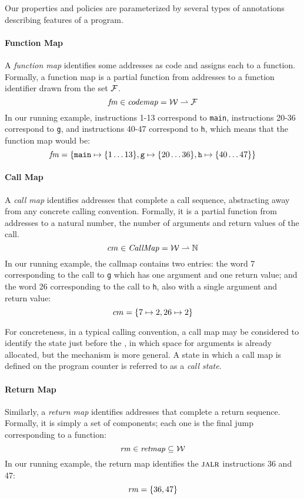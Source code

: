 \documentclass[acmsmall,review,anonymous]{acmart}\settopmatter{printfolios=true,printccs=false,printacmref=false}
\begin{document}
Our properties and policies are parameterized by several types of
annotations describing features of a program.

\paragraph*{Function Map}

A {\em function map} identifies some addresses as code and assigns
each to a function. Formally, a function map is a
partial function from addresses to a function
identifier drawn from the set \(\mathcal{F}\).
\[\mathit{fm} \in \mathit{codemap} = {\mathcal W} \rightharpoonup \mathcal{F}\]
%
In our running example, instructions 1-13 correspond to {\tt main},
instructions 20-36 correspond to {\tt g}, and instructions 40-47
correspond to {\tt h}, which means that the function map would be:
\[ \mathit{fm} = \{\texttt{main} \mapsto \{1\ldots13\}, \texttt{g} \mapsto \{20\ldots36\}, \texttt{h} \mapsto \{40\ldots47\}\}\]

\paragraph*{Call Map}

A {\em call map} identifies addresses that complete a call sequence,
abstracting away from any concrete calling convention. Formally, it is
a partial function from addresses to a natural number, the number of
arguments and return values of the call.
\[cm \in \mathit{CallMap} = {\mathcal W} \rightharpoonup \mathbb{N}\]
%
In our running example, the callmap contains two entries: the word 7
corresponding to the call to {\tt g} which has one argument and one
return value; and the word 26 corresponding to the call to {\tt h},
also with a single argument and return value:
\[ cm = \{ 7 \mapsto 2, 26 \mapsto 2\}\]

For concreteness, in a typical calling convention, a call map may be
considered to identify the state just before the \jal, in which
space for arguments is already allocated, but the mechanism is more
general. A state in which a call map is defined on the program counter
is referred to as a {\it call state}.

\paragraph*{Return Map}
Similarly, a {\em return map} identifies addresses that complete a
return sequence. Formally, it is simply a set of components; each one
is the final jump corresponding to a function:
%
\[\mathit{rm} \in \mathit{retmap} \subseteq {\mathcal W}\]
%
In our running example, the return map identifies the $\textsc{jalr}$
instructions 36 and 47:
\[ \mathit{rm} = \{36, 47\} \]
\end{document}
